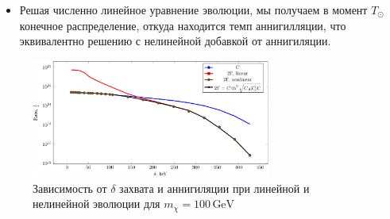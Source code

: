 \begin{itemize}
	\item Решая численно линейное уравнение эволюции, мы получаем в момент $T_{\odot}$ конечное распределение, откуда находится темп аннигилляции, что эквивалентно решению с нелинейной добавкой от аннигиляции.
\end{itemize}


\begin{figure}[!h]
	\centering
	\includegraphics[width=0.7\textwidth]{images/LinearNonLinear.png}
	\caption{Зависимость от $\delta$ захвата и аннигиляции при линейной и нелинейной эволюции для $m_{\chi} = 100 \,\text{GeV}$}
\end{figure}
